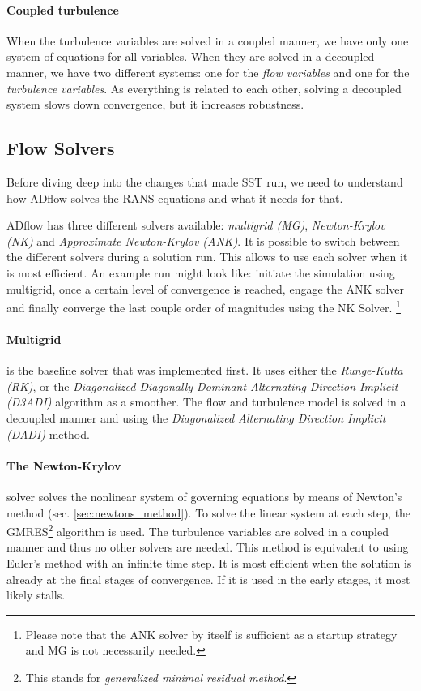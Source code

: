 \paragraph{Coupled turbulence} When the turbulence variables are solved in a
coupled manner, we have only one system of equations for all variables. When
they are solved in a decoupled manner, we have two different systems: one for
the \textit{flow variables} and one for the \textit{turbulence variables}. As
everything is related to each other, solving a decoupled system slows down
convergence, but it increases robustness.




\subsection{Flow Solvers}
\label{sec:flow_solvers}
Before diving deep into the changes that made SST run, we need to understand
how ADflow solves the RANS equations and what it needs for that.

ADflow has three different solvers available: \textit{multigrid (MG)},
\textit{Newton-Krylov (NK)} and \textit{Approximate Newton-Krylov (ANK)}. It is
possible to switch between the different solvers during a solution run. This
allows to use each solver when it is most efficient. An example run might look
like: initiate the simulation using multigrid, once a certain level of
convergence is reached, engage the ANK solver and finally converge the last
couple order of magnitudes using the NK Solver. \footnote{Please note that the
ANK solver by itself is sufficient as a startup strategy and MG is not
necessarily needed.}

\paragraph{Multigrid} is the baseline solver that was implemented first. It
uses either the \textit{Runge-Kutta (RK)}, or the \textit{Diagonalized
Diagonally-Dominant Alternating Direction Implicit (D3ADI)} algorithm as a
smoother. The flow and turbulence model is solved in a decoupled manner and
using the \textit{Diagonalized Alternating Direction Implicit (DADI)} method.

\paragraph{The Newton-Krylov} solver solves the nonlinear system of governing
equations by means of Newton's method (sec. \ref{sec:newtons_method}). To solve
the linear system at each step, the GMRES\footnote{This stands for
\textit{generalized minimal residual method}.} algorithm is used. The
turbulence variables are solved in a coupled manner and thus no other solvers
are needed. This method is equivalent to using Euler's method with an infinite
time step. It is most efficient when the solution is already at the final
stages of convergence. If it is used in the early stages, it most likely
stalls.

